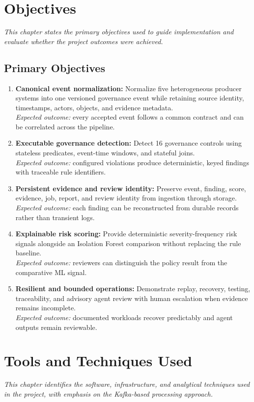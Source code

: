 \documentclass[12pt,oneside]{report}
\begin{document}
\chapter{Objectives}
\noindent\textit{This chapter states the primary objectives used to guide implementation and evaluate whether the project outcomes were achieved.}\par
\section{Primary Objectives}
\begin{enumerate}[leftmargin=*]
\item \textbf{Canonical event normalization:} Normalize five heterogeneous producer systems into one versioned governance event while retaining source identity, timestamps, actors, objects, and evidence metadata.\\[-2pt]\textit{Expected outcome:} every accepted event follows a common contract and can be correlated across the pipeline.
\item \textbf{Executable governance detection:} Detect 16 governance controls using stateless predicates, event-time windows, and stateful joins.\\[-2pt]\textit{Expected outcome:} configured violations produce deterministic, keyed findings with traceable rule identifiers.
\item \textbf{Persistent evidence and review identity:} Preserve event, finding, score, evidence, job, report, and review identity from ingestion through storage.\\[-2pt]\textit{Expected outcome:} each finding can be reconstructed from durable records rather than transient logs.
\item \textbf{Explainable risk scoring:} Provide deterministic severity-frequency risk signals alongside an Isolation Forest comparison without replacing the rule baseline.\\[-2pt]\textit{Expected outcome:} reviewers can distinguish the policy result from the comparative ML signal.
\item \textbf{Resilient and bounded operations:} Demonstrate replay, recovery, testing, traceability, and advisory agent review with human escalation when evidence remains incomplete.\\[-2pt]\textit{Expected outcome:} documented workloads recover predictably and agent outputs remain reviewable.
\end{enumerate}

\chapter{Tools and Techniques Used}
\noindent\textit{This chapter identifies the software, infrastructure, and analytical techniques used in the project, with emphasis on the Kafka-based processing approach.}\par
\end{document}
